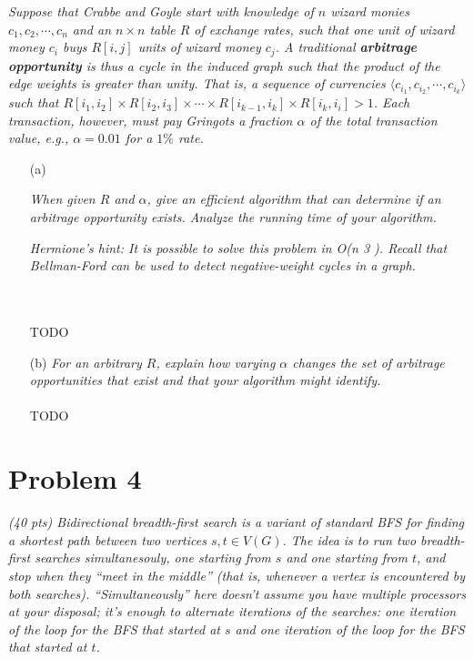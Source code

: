 \documentclass[12pt]{article} \setlength{\oddsidemargin}{0in}
\begin{document}
\textit{Suppose that Crabbe and Goyle start with knowledge of $n$ wizard monies $c_1, c_2, \cdots, c_n$
and an $n \times n$ table $R$ of exchange rates, such that one unit of wizard money $c_i$ buys
$R[i, j]$ units of wizard money $c_j$. A traditional \textbf{arbitrage opportunity} is thus a cycle
in the induced graph such that the product of the edge weights is greater than unity.
That is, a sequence of currencies $\langle c_{i_{1}}, c_{i_{2}} , \cdots , c_{i_{k}} \rangle$ such that $R[i_1, i_2] \times R[i_2, i_3] \times \cdots \times R[i_{k−1}, i_k] \times R[i_k, i_i] > 1$. Each transaction, however, must pay Gringots a fraction $\alpha$ of the total transaction value, e.g., $\alpha = 0.01$ for a $1\%$ rate.}

\begin{enumerate}
\item[(a)]{\textit{When given $R$ and $\alpha$, give an efficient algorithm that can determine if an arbitrage opportunity exists. Analyze the running time of your algorithm.}

    \textit{Hermione’s hint: It is possible to solve this problem in O(n 3 ). Recall that Bellman-Ford can be used to detect negative-weight cycles in a graph.}
  }
  \\\\
  TODO
  \\
\item[(b)]{\textit{For an arbitrary $R$, explain how varying $\alpha$ changes the set of arbitrage opportunities that exist and that your algorithm might identify.}}
  \\\\
  TODO

\end{enumerate}

\newpage
\section*{Problem 4}

\textit{(40 pts) Bidirectional breadth-first search is a variant of standard BFS for finding a
shortest path between two vertices $s, t \in V(G)$. The idea is to run two breadth-first
searches simultanesouly, one starting from $s$ and one starting from $t$, and stop when
they “meet in the middle” (that is, whenever a vertex is encountered by both searches).
``Simultaneously'' here doesn’t assume you have multiple processors at your disposal;
it’s enough to alternate iterations of the searches: one iteration of the loop for the BFS
that started at $s$ and one iteration of the loop for the BFS that started at $t$.}
\end{document}
